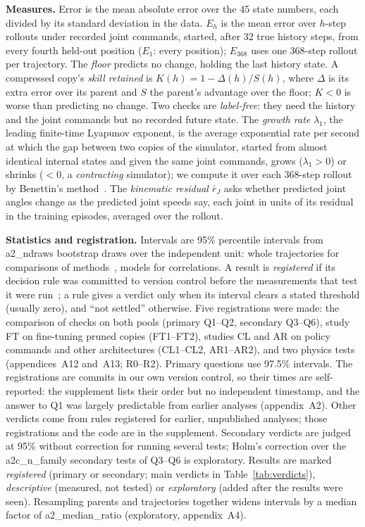 \textbf{Measures.} Error is the mean absolute error over the 45 state numbers, each divided by its standard deviation
in the data. $E_h$ is the mean error over $h$-step rollouts under recorded joint commands, started, after 32 true history steps, from every fourth
held-out position ($E_1$: every position); $E_{368}$ uses one 368-step rollout per trajectory. The \emph{floor}
predicts no change, holding the last history state. A compressed copy's \emph{skill retained} is $K(h)=1-\Delta(h)/S(h)$,
where $\Delta$ is its extra error over its parent and $S$ the parent's advantage over the floor; $K<0$ is worse than
predicting no change. Two checks are \emph{label-free}: they need the history and the joint commands but no recorded
future state. The \emph{growth rate} $\lambda_1$, the leading finite-time Lyapunov exponent, is the average
exponential rate per second at which the gap between two copies of the simulator, started from almost identical
internal states and given the same joint commands, grows ($\lambda_1>0$) or shrinks ($<0$, a \emph{contracting}
simulator); we compute it over each 368-step rollout by Benettin's method~\cite{benettin1980}. The \emph{kinematic
residual} $\bar r_J$ asks whether predicted joint angles change as the predicted joint speeds say, each joint in units
of its residual in the training episodes, averaged over the rollout.

\textbf{Statistics and registration.} Intervals are 95\% percentile intervals from {{a2_ndraws}} bootstrap draws over
the independent unit: whole trajectories for comparisons of methods~\cite{cameron2008,agarwal2021}, models for
correlations. A result is \emph{registered} if its decision rule was committed to version control before the
measurements that test it were run~\cite{nosek2018prereg}; a rule gives a verdict only when its interval clears a stated threshold
(usually zero), and ``not settled'' otherwise. Five registrations were made: the comparison of checks
on both pools (primary Q1--Q2, secondary Q3--Q6), study FT on fine-tuning pruned copies (FT1--FT2), studies CL
and AR on policy commands and other architectures (CL1--CL2, AR1--AR2), and two physics tests (appendices~A12 and~A13; R0--R2). Primary questions use 97.5\% intervals. The registrations are
commits in our own version control, so their times are self-reported: the supplement lists their order but
no independent timestamp, and the answer to Q1 was largely predictable from earlier analyses (appendix~A2). Other verdicts come from rules registered for earlier,
unpublished analyses; those registrations and the code are in the supplement. Secondary
verdicts are judged at 95\% without correction for running several tests; Holm's correction over the {{a2c_n_family}} secondary tests of Q3--Q6
is exploratory. Results are marked \emph{registered} (primary or secondary; main verdicts in Table~\ref{tab:verdicts}),
\emph{descriptive} (measured, not tested) or \emph{exploratory} (added after the results were seen). Resampling parents and trajectories together widens intervals by a median factor of
{{a2_median_ratio}} (exploratory, appendix~A4).

